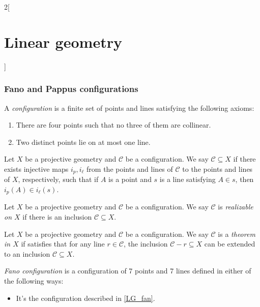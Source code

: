 \documentclass[../../../main.tex]{subfiles}
\begin{document}
\begin{multicols}{2}[\section{Linear geometry}]
    \subsubsection{Fano and Pappus configurations}
    \begin{definition}
        A \textit{configuration} is a finite set of points and lines satisfying the following axioms:
        \begin{enumerate}
            \item There are four points such that no three of them are collinear.
            \item Two distinct points lie on at most one line.
        \end{enumerate}
    \end{definition}
    \begin{definition}
        Let $X$ be a projective geometry and $\mathcal{C}$ be a configuration. We say $\mathcal{C}\subseteq X$ if there exists injective maps $i_p,i_\ell$ from the points and lines of $\mathcal{C}$ to the points and lines of $X$, respectively, such that if $A$ is a point and $s$ is a line satisfying $A\in s$, then $i_p(A)\in i_\ell(s)$.
    \end{definition}
    \begin{definition}
        Let $X$ be a projective geometry and $\mathcal{C}$ be a configuration. We say $\mathcal{C}$ is \textit{realizable on $X$} if there is an inclusion $\mathcal{C}\subseteq X$.
    \end{definition}
    \begin{definition}
        Let $X$ be a projective geometry and $\mathcal{C}$ be a configuration. We say $\mathcal{C}$ is a \textit{theorem in $X$} if satisfies that for any line $r\in\mathcal{C}$, the inclusion $\mathcal{C}-r\subseteq X$ can be extended to an inclusion $\mathcal{C}\subseteq X$.
    \end{definition}
    \begin{definition}
        \textit{Fano configuration} is a configuration of 7 points and 7 lines defined in either of the following ways:
        \begin{itemize}
            \item It's the configuration described in \cref{LG_fan}.
                  \begin{center}
                      \begin{minipage}{\linewidth}
                          \centering
                          

\end{minipage}
\end{center}
\end{itemize}
\end{definition}
\end{multicols}
\end{document}
